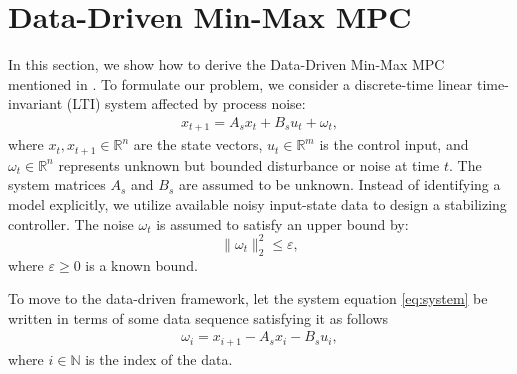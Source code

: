 \section{Data-Driven Min-Max MPC}
\label{sec:data_driven_mpc}
In this section, we show how to derive the Data-Driven Min-Max MPC mentioned in \cite{xie2024}.
To formulate our problem, we consider a discrete-time  linear time-invariant (LTI) system affected by process noise:
	\begin{align*}
		\label{eq:system}
		x_{t+1} = A_s x_t + B_s u_t + \omega_t,
	\end{align*}
where \(x_t, x_{t+1} \in \mathbb{R}^n\) are the state vectors, \(u_t \in \mathbb{R}^m\) is the control input, and \(\omega_t \in \mathbb{R}^n\) represents unknown but bounded disturbance or noise at time \(t\).
The system matrices \(A_s\) and \(B_s\) are assumed to be unknown.
Instead of identifying a model explicitly, we utilize available noisy input-state data to design a stabilizing controller.
The noise \(\omega_t\) is assumed to satisfy an upper bound by:
\[
\|\omega_t\|_2^2 \leq \varepsilon,
\]
where \(\varepsilon \geq 0\) is a known bound.

To move to the data-driven framework, let the system equation \ref{eq:system} be written in terms of some data sequence satisfying it as follows
	\begin{align*}
		\omega_i = x_{i+1} - A_s x_i - B_s u_i,
	\end{align*}
where $i \in \mathbb{N}$ is the index of the data.

